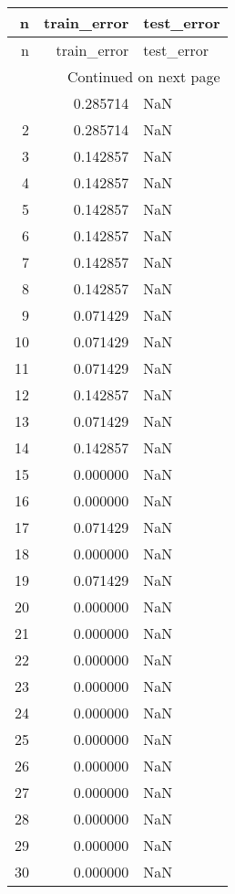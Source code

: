 \begin{longtable}{rrl}
\toprule
n & train_error & test_error \\
\midrule
\endfirsthead
\toprule
n & train_error & test_error \\
\midrule
\endhead
\midrule
\multicolumn{3}{r}{Continued on next page} \\
\midrule
\endfoot
\bottomrule
\endlastfoot
1 & 0.285714 & NaN \\
2 & 0.285714 & NaN \\
3 & 0.142857 & NaN \\
4 & 0.142857 & NaN \\
5 & 0.142857 & NaN \\
6 & 0.142857 & NaN \\
7 & 0.142857 & NaN \\
8 & 0.142857 & NaN \\
9 & 0.071429 & NaN \\
10 & 0.071429 & NaN \\
11 & 0.071429 & NaN \\
12 & 0.142857 & NaN \\
13 & 0.071429 & NaN \\
14 & 0.142857 & NaN \\
15 & 0.000000 & NaN \\
16 & 0.000000 & NaN \\
17 & 0.071429 & NaN \\
18 & 0.000000 & NaN \\
19 & 0.071429 & NaN \\
20 & 0.000000 & NaN \\
21 & 0.000000 & NaN \\
22 & 0.000000 & NaN \\
23 & 0.000000 & NaN \\
24 & 0.000000 & NaN \\
25 & 0.000000 & NaN \\
26 & 0.000000 & NaN \\
27 & 0.000000 & NaN \\
28 & 0.000000 & NaN \\
29 & 0.000000 & NaN \\
30 & 0.000000 & NaN \\
\end{longtable}

